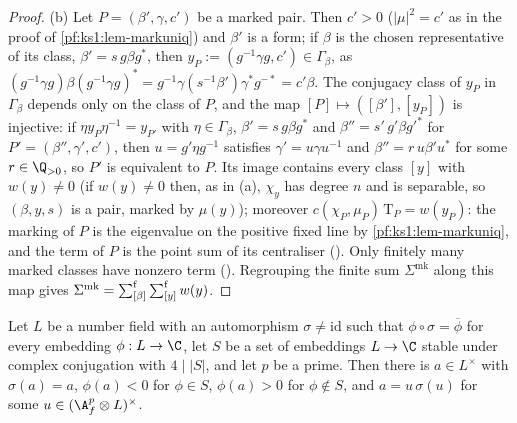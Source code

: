 \begin{proof}
(b) Let $P=(\beta',\gamma,c')$ be a marked pair. Then $c'>0$ ($|\mu|^2=c'$ as in the proof of \cref{pf:ks1:lem-markuniq}) and
$\beta'$ is a form; if $\beta$ is the chosen representative of its class, $\beta'=s\,g\beta g^*$, then
$y_P:=(g^{-1}\gamma g,c')\in\Gamma_\beta$, as $(g^{-1}\gamma g)\beta(g^{-1}\gamma g)^*=g^{-1}\gamma(s^{-1}\beta')\gamma^*g^{-*}=c'\beta$. The
conjugacy class of $y_P$ in $\Gamma_\beta$ depends only on the class of $P$, and the map $[P]\mapsto([\beta'],[y_P])$ is injective: if
$\eta y_P\eta^{-1}=y_{P'}$ with $\eta\in\Gamma_\beta$, $\beta'=s\,g\beta g^*$ and $\beta''=s'\,g'\beta g'^*$ for $P'=(\beta'',\gamma',c')$, then
$u=g'\eta g^{-1}$ satisfies $\gamma'=u\gamma u^{-1}$ and $\beta''=r\,u\beta'u^*$ for some $r\in\Q_{>0}$, so $P'$ is equivalent to $P$. Its image contains every class $[y]$ with $w(y)\neq0$ (if
$w(y)\neq0$ then, as in (a), $\chi_y$ has degree $n$ and is separable, so $(\beta,y,s)$ is a pair, marked by $\mu(y)$); moreover
$c(\chi_P,\mu_P)\,\mathrm T_P=w(y_P)$: the marking of $P$ is the eigenvalue on the positive fixed
line by \cref{pf:ks1:lem-markuniq}, and the term of $P$ is the point sum of its centraliser
(). Only finitely many marked classes have nonzero term
(). Regrouping the finite sum $\Sigma^{\mathrm{mk}}$ along
this map gives $\Sigma^{\mathrm{mk}}=\textstyle\sum\nolimits^{\mathrm f}_{[\beta]}\textstyle\sum\nolimits^{\mathrm f}_{[y]}w(y)$.
\end{proof}

\begin{lemma}\label{pf:ks1:lem-normsign}
Let $L$ be a number field with an automorphism $\sigma\neq\mathrm{id}$ such that $\phi\circ\sigma=\overline{\phi}$ for every embedding $\phi:L\to\C$, let
$S$ be a set of embeddings $L\to\C$ stable under complex conjugation with $4\mid|S|$, and let $p$ be a prime. Then there is $a\in L^\times$ with
$\sigma(a)=a$, $\phi(a)<0$ for $\phi\in S$, $\phi(a)>0$ for $\phi\notin S$, and $a=u\,\sigma(u)$ for some $u\in(\ksoneAfp\otimes L)^\times$.
\end{lemma}


